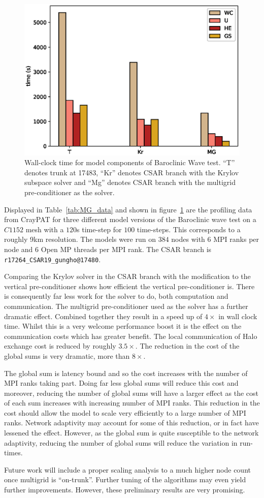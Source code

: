 \begin{figure}[ht!]
\centering\includegraphics[width=1.0\linewidth]{figs/mg-improvement.eps}
\caption{\label{fig:mg}Wall-clock time for model components of
  Baroclinic Wave test. ``T'' denotes trunk at 17483, ``Kr'' denotes
  CSAR branch with the Krylov subspace solver and ``Mg'' denotes
  CSAR branch with the multigrid pre-conditioner as the solver.}
\end{figure} 

Displayed in Table~\ref{tab:MG_data} and shown in figure~\ref{fig:mg}
are the profiling data from CrayPAT for three different model versions
of the Baroclinic wave test on a $C1152$ mesh with a $120$s time-step
for $100$ time-steps. This corresponds to a roughly 9km
resolution. The models were run on $384$ nodes with $6$ MPI ranks per
node and $6$ Open MP threads per MPI rank.  The CSAR branch is
\verb+r17264_CSAR19_gungho@17480+.

Comparing the Krylov solver in the CSAR branch with the modification
to the vertical pre-conditioner shows how efficient the vertical
pre-conditioner is. There is consequently far less work for the solver
to do, both computation and communication. The multigrid
pre-conditioner used as the solver has a further dramatic
effect. Combined together they result in a speed up of $4 \times $ in
wall clock time. Whilst this is a very welcome performance boost it is
the effect on the communication costs which has greater benefit. The
local communication of Halo exchange cost is reduced by roughly
$3.5 \times $. The reduction in the cost of the global sums is very
dramatic, more than $8 \times$. 

The global sum is latency bound and so the cost increases with the
number of MPI ranks taking part. Doing far less global sums will
reduce this cost and moreover, reducing the number of global sums will
have a larger effect as the cost of each sum increases with increasing
number of MPI ranks. This reduction in the cost should
allow the model to scale very efficiently to a large number of MPI
ranks. Network adaptivity may account for some of this reduction, or
in fact have lessened the effect. However, as the global sum is quite
susceptible to the network adaptivity, reducing the number of global
sums will reduce the variation in run-times.

Future work will include a proper scaling analysis to a much higher
node count once multigrid is ``on-trunk''. Further tuning of the
algorithms may even yield further improvements. However, these
preliminary results are very promising.
 